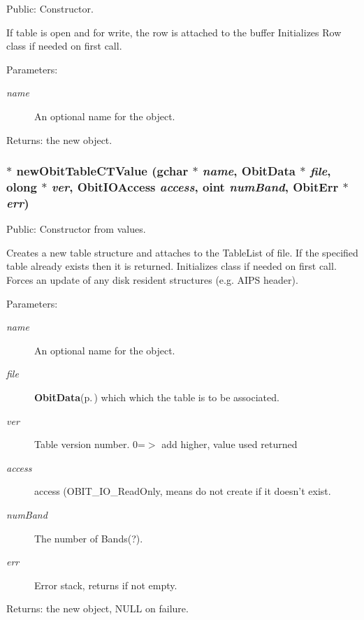 Public: Constructor. 

If table is open and for write, the row is attached to the buffer Initializes Row class if needed on first call. \begin{Desc}
\item[Parameters:]
\begin{description}
\item[{\em name}]An optional name for the object. \end{description}
\end{Desc}
\begin{Desc}
\item[Returns:]the new object. \end{Desc}
\subsubsection{$\ast$ new\-Obit\-Table\-CTValue (gchar $\ast$ {\em name}, {\bf Obit\-Data} $\ast$ {\em file}, {\bf olong} $\ast$ {\em ver}, Obit\-IOAccess {\em access}, {\bf oint} {\em num\-Band}, {\bf Obit\-Err} $\ast$ {\em err})}\label{ObitTableCT_8h_a12}


Public: Constructor from values. 

Creates a new table structure and attaches to the Table\-List of file. If the specified table already exists then it is returned. Initializes class if needed on first call. Forces an update of any disk resident structures (e.g. AIPS header). \begin{Desc}
\item[Parameters:]
\begin{description}
\item[{\em name}]An optional name for the object. \item[{\em file}]{\bf Obit\-Data}{\rm (p.\,\pageref{structObitData})} which which the table is to be associated. \item[{\em ver}]Table version number. 0=$>$ add higher, value used returned \item[{\em access}]access (OBIT\_\-IO\_\-Read\-Only, means do not create if it doesn't exist. \item[{\em num\-Band}]The number of Bands(?). \item[{\em err}]Error stack, returns if not empty. \end{description}
\end{Desc}
\begin{Desc}
\item[Returns:]the new object, NULL on failure. \end{Desc}
